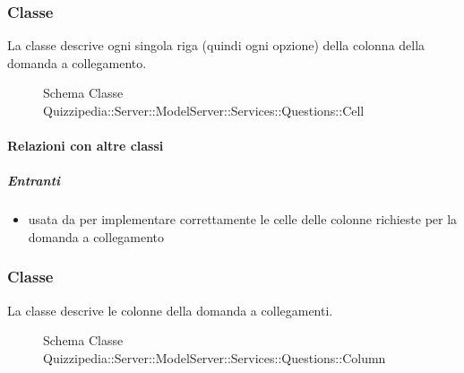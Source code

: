 \subsubsection{Classe }
La classe descrive ogni singola riga (quindi ogni opzione) della colonna della domanda a collegamento.
\begin{figure}[H]
\centering
\noindent{}
\caption[Schema Classe Cell]{Schema Classe Quizzipedia::Server::ModelServer::Services::Questions::Cell}
\end{figure}
\paragraph{Relazioni con altre classi}
\subparagraph{Entranti}
\begin{itemize}
\item usata da  per implementare correttamente le celle delle colonne richieste per la domanda a collegamento
\end{itemize}
\subsubsection{Classe }
La classe descrive le colonne della domanda a collegamenti.
\begin{figure}[H]
\centering
\noindent{}
\caption[Schema Classe Column]{Schema Classe Quizzipedia::Server::ModelServer::Services::Questions::Column}
\end{figure}
